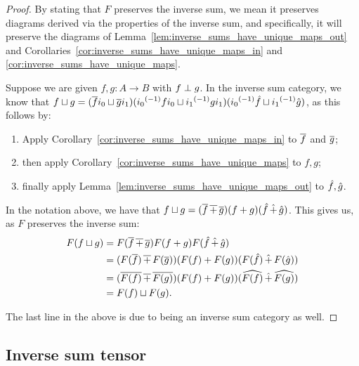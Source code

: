 \begin{proof}
  By stating that $F$ preserves the inverse sum, we mean it preserves diagrams derived via the
  properties of the inverse sum, and specifically, it will preserve the diagrams of
  Lemma~\ref{lem:inverse_sums_have_unique_maps_out} and
  Corollaries~\ref{cor:inverse_sums_have_unique_maps_in} and
  \ref{cor:inverse_sums_have_unique_maps}.

  Suppose we are given $f, g: A \to B$ with $f \perp g$. In the inverse sum category, we know that
  $f \sqcup g = (\overline{f}i_0 \sqcup \overline{g} i_1) ({i_0}^{(-1)} f i_0 \sqcup {i_1}^{(-1)} g i_1)
  ({i_0}^{(-1)} \hat{f} \sqcup {i_1}^{(-1)} \hat{g})$, as this follows by:
  \begin{enumerate}
    \item Apply Corollary~\ref{cor:inverse_sums_have_unique_maps_in} to $\overline{f}$ and $\overline{g}$;
    \item then apply Corollary~\ref{cor:inverse_sums_have_unique_maps} to $f, g$;
    \item finally apply Lemma~\ref{lem:inverse_sums_have_unique_maps_out} to $\hat{f}, \hat{g}$.
  \end{enumerate}

  In the notation above, we have that $f\sqcup g =
  (\overline{f} \operatorname{\overline{+}} \overline{g})({{f}+{g}})(\hat{f} \operatorname{\hat{+}} \hat{g})$. This gives us, as $F$ preserves
  the inverse sum:
  \begin{align*}
    F(f\sqcup g) &= F(\overline{f}\operatorname{\overline{+}} \overline{g})F({{f}+{g}})F(\hat{f} \operatorname{\hat{+}} \hat{g})\\
    &=(F(\overline{f})\operatorname{\overline{+}} F(\overline{g}))({{F(f)}+{F(g)}})(F(\hat{f}) \operatorname{\hat{+}} F(\hat{g}))\\
    &=(\overline{F(f)}\operatorname{\overline{+}} \overline{F(g)})({{F(f)}+{F(g)}})(\widehat{F(f)} \operatorname{\hat{+}} \widehat{F(g)})\\
    &=F(f) \sqcup F(g).
  \end{align*}

  The last line in the above is due to \Y being an inverse sum category as well.

\end{proof}



\subsection{Inverse sum tensor} %
